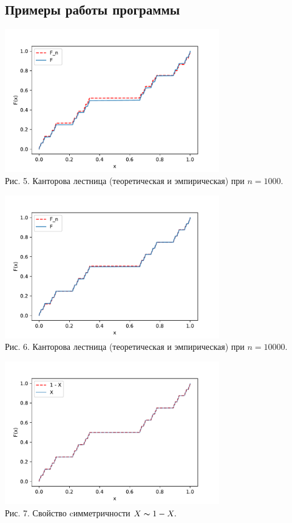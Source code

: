 \documentclass[11pt]{article}
\begin{document}
	\subsection{Примеры работы программы}
	\begin{center}
		\includegraphics[width=0.7\textwidth]{2_2.pdf}\\
		{Рис. 5. Канторова лестница (теоретическая и эмпирическая) при $n = 1000$.}
	\end{center}
	\begin{center}
		\includegraphics[width=0.7\textwidth]{2_1.pdf}\\
		{Рис. 6. Канторова лестница (теоретическая и эмпирическая) при $n = 10000$. }
	\end{center}
	\begin{center}
		\includegraphics[width=0.7\textwidth]{2_3.pdf}\\
		{Рис. 7. Свойство cимметричности $X \thicksim 1 - X.$  }
	\end{center}
\end{document}

